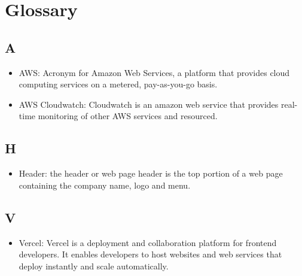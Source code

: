\section{Glossary}
\subsection{A}
\begin{itemize}
\item AWS: Acronym for Amazon Web Services, a platform that provides cloud computing services on a metered, pay-as-you-go basis.
\item AWS Cloudwatch: Cloudwatch is an amazon web service that provides real-time monitoring of other AWS services and resourced.
\end{itemize}
\subsection{H}
\begin{itemize}
\item Header: the header or web page header is the top portion of a web page containing the company name, logo and menu.
\end{itemize}
\subsection{V}
\begin{itemize}
\item Vercel: Vercel is a deployment and collaboration platform for frontend developers. It enables developers to host websites and web services that deploy instantly and scale automatically.
\end{itemize}